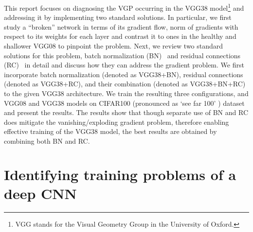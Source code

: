 \documentclass{article}
\begin{document}
This report focuses on diagnosing the VGP occurring in the VGG38 model\footnote{VGG stands for the Visual Geometry Group in the University of Oxford.} and addressing it by implementing two standard solutions.
In particular, we first study a ``broken'' network in terms of its gradient flow, norm of gradients with respect to its weights for each layer and contrast it to ones in the healthy and shallower VGG08 to pinpoint the problem.
Next, we review two standard solutions for this problem,  batch normalization (BN)~\cite{ioffe2015batch} and residual connections (RC)~\cite{he2016deep} in detail and discuss how they can address the gradient problem.
We first incorporate batch normalization (denoted as VGG38+BN), residual connections (denoted as VGG38+RC),  and their combination (denoted as VGG38+BN+RC) to the given VGG38 architecture.
We train the resulting three configurations, and VGG08 and VGG38 models on CIFAR100 (pronounced as `see far 100' ) dataset and present the results.
The results show that though separate use of BN and RC does mitigate the vanishing/exploding gradient problem, therefore enabling effective training of the VGG38 model, the best results are obtained by combining both BN and RC.

%


\section{Identifying training problems of a deep CNN}
\label{sec:task1}
\end{document}
